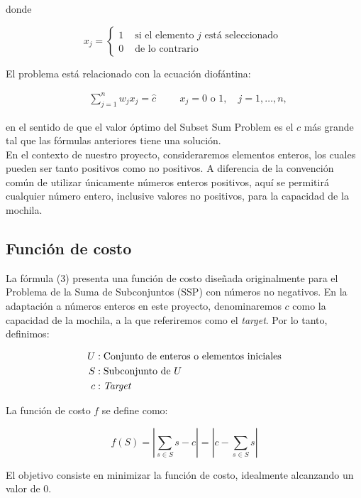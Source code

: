 \documentclass[spanish,12pt,letterpaper]{article}
\begin{document}
	
	donde
	
	$$
	x_{j}= \begin{cases}1 & \text{ si el elemento } j \text{ está seleccionado } \\ 0 & \text{ de lo contrario }\end{cases}
	$$
	
	El problema está relacionado con la ecuación diofántina:
	

	\begin{align}
		& \sum_{j=1}^{n} w_{j} x_{j}=\hat{c} \hspace{1cm} x_{j}=0 \text{ o } 1, \quad j=1, \ldots, n,
	\end{align}
	
	en el sentido de que el valor óptimo del Subset Sum Problem es el $\hat{c}$ más grande tal que las fórmulas anteriores tiene una solución.\\
	
	En el contexto de nuestro proyecto, consideraremos elementos enteros, los cuales pueden ser tanto positivos como no positivos. A diferencia de la convención común de utilizar únicamente números enteros positivos, aquí se permitirá cualquier número entero, inclusive valores no positivos, para la capacidad de la mochila.
	
	\subsection{Función de costo}
	
	La fórmula (3) presenta una función de costo diseñada originalmente para el Problema de la Suma de Subconjuntos (SSP) con números no negativos. En la adaptación a números enteros en este proyecto, denominaremos $c$ como la capacidad de la mochila, a la que referiremos como el \textit{target}. Por lo tanto, definimos:
	
	\begin{align*}
		U &: \text{Conjunto de enteros o elementos iniciales} \\
		S &: \text{Subconjunto de } U\\
		c &: \text{\textit{Target}}
	\end{align*} 
	
	La función de costo $f$ se define como:
	
	\[
	f(S) = \left|\sum_{s\in S} s - c\right|  = \left|c - \sum_{s\in S} s \right|
	\]
	
	El objetivo consiste en minimizar la función de costo, idealmente alcanzando un valor de $0$.
	
\end{document}

